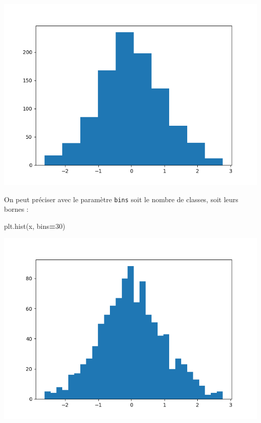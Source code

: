 \documentclass[
  12pt,
]{book}
\newenvironment{Shaded}{\begin{snugshade}}{\end{snugshade}}
\newcommand{\DecValTok}[1]{\textcolor[rgb]{0.00,0.00,0.81}{#1}}
\newcommand{\NormalTok}[1]{#1}
\newcommand{\OperatorTok}[1]{\textcolor[rgb]{0.81,0.36,0.00}{\textbf{#1}}}
\numberwithin{equation}{section}
\numberwithin{countremarque}{section}
\begin{document}
\begin{center}\includegraphics[width=9.03in]{figs/pyplot/histogramme} \end{center}

On peut préciser avec le paramètre \texttt{bins} soit le nombre de classes, soit leurs bornes :

\begin{Shaded}
\begin{Highlighting}[]
\NormalTok{plt.hist(x, bins}\OperatorTok{=}\DecValTok{30}\NormalTok{)}
\end{Highlighting}
\end{Shaded}

\begin{center}\includegraphics[width=9.03in]{figs/pyplot/histogramme_bins} \end{center}
\end{document}
